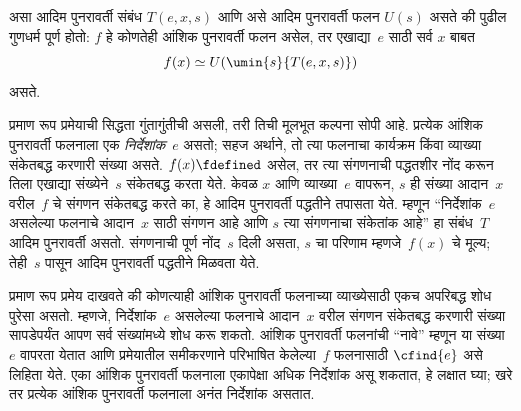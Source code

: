 \documentclass[../../../include/open-logic-section]{subfiles}
\begin{document}

\begin{thm}[क्लिनीचे प्रमाण रूप प्रमेय]
असा आदिम पुनरावर्ती संबंध $T(e, x, s)$ आणि असे आदिम पुनरावर्ती फलन
$U(s)$ असते की पुढील गुणधर्म पूर्ण होतो: $f$ हे कोणतेही आंशिक पुनरावर्ती
फलन असेल, तर एखाद्या~$e$ साठी सर्व $x$ बाबत
\[
f(x) \simeq U(\umin{s}{T(e, x, s)})
\]
असते.
\end{thm}

\begin{explain}
प्रमाण रूप प्रमेयाची सिद्धता गुंतागुंतीची असली, तरी तिची मूलभूत कल्पना
सोपी आहे. प्रत्येक आंशिक पुनरावर्ती फलनाला एक \emph{निर्देशांक}~$e$
असतो; सहज अर्थाने, तो त्या फलनाचा कार्यक्रम किंवा व्याख्या संकेतबद्ध
करणारी संख्या असते. $f(x) \fdefined$ असेल, तर त्या संगणनाची पद्धतशीर
नोंद करून तिला एखाद्या संख्येने~$s$ संकेतबद्ध करता येते. केवळ $x$ आणि
व्याख्या~$e$ वापरून, $s$ ही संख्या आदान~$x$ वरील~$f$ चे संगणन
संकेतबद्ध करते का, हे आदिम पुनरावर्ती पद्धतीने तपासता येते. म्हणून
``निर्देशांक~$e$ असलेल्या फलनाचे आदान~$x$ साठी संगणन आहे आणि $s$
त्या संगणनाचा संकेतांक आहे'' हा संबंध~$T$ आदिम पुनरावर्ती असतो.
संगणनाची पूर्ण नोंद~$s$ दिली असता, $s$ चा परिणाम म्हणजे~$f(x)$ चे मूल्य;
तेही~$s$ पासून आदिम पुनरावर्ती पद्धतीने मिळवता येते.

प्रमाण रूप प्रमेय दाखवते की कोणत्याही आंशिक पुनरावर्ती फलनाच्या
व्याख्येसाठी एकच अपरिबद्ध शोध पुरेसा असतो. म्हणजे, निर्देशांक~$e$
असलेल्या फलनाचे आदान~$x$ वरील संगणन संकेतबद्ध करणारी संख्या सापडेपर्यंत
आपण सर्व संख्यांमध्ये शोध करू शकतो. आंशिक पुनरावर्ती फलनांची ``नावे''
म्हणून या संख्या~$e$ वापरता येतात आणि प्रमेयातील समीकरणाने परिभाषित
केलेल्या~$f$ फलनासाठी $\cfind{e}$ असे लिहिता येते. एका आंशिक
पुनरावर्ती फलनाला एकापेक्षा अधिक निर्देशांक असू शकतात, हे लक्षात घ्या;
खरे तर प्रत्येक आंशिक पुनरावर्ती फलनाला अनंत निर्देशांक असतात.
\end{explain}
\end{document}
